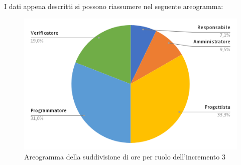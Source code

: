 \pagebreak
I dati appena descritti si possono riassumere nel seguente areogramma:
\begin{figure}[!h]
    \vspace{5px}
    \includegraphics[scale=0.5]{../../../Images/Diagrammi/Diagramma a torta/areogrammaIncremento8.png}
    \centering
    \caption{Areogramma della suddivisione di ore per ruolo dell'incremento 3}
\end{figure}

